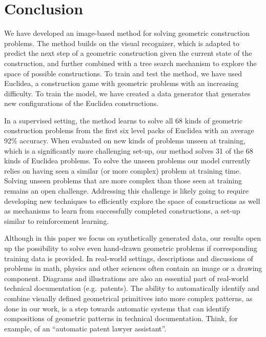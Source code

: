 

\section{Conclusion}

We have developed an image-based method for solving geometric construction problems. The method builds on the \maskrcnn visual recognizer, which is adapted to predict the next step of a geometric construction given the current state of the construction, and further combined with a tree search mechanism to explore the space of possible constructions. To train and test the method, we have used Euclidea, a construction game with geometric problems with an increasing difficulty. To train the model, we have created a data generator that generates new configurations of the Euclidea constructions. 

In a supervised setting, the method learns to solve all 68 kinds of geometric construction problems from the first six level packs of Euclidea with an average 92\% accuracy. When evaluated on new kinds of problems unseen at training, which is a significantly more challenging set-up, our method solves 31 of the 68 kinds of Euclidea problems. 
To solve the unseen problems our model currently relies on having seen a similar (or more complex) problem at training time. Solving unseen problems that are more complex than those seen at training remains an open challenge. Addressing this challenge is likely going to require developing new techniques to efficiently explore the space of constructions as well as mechanisms to learn from successfully completed constructions, a set-up similar to reinforcement learning. 

Although in this paper we focus on synthetically generated data, our results open up the possibility to solve even hand-drawn geometric problems if corresponding training data is provided. 
In real-world settings, descriptions and discussions of problems in math, physics and other sciences often contain an image or a drawing component. Diagrams and illustrations are also an essential part of real-world technical documentation (e.g.~patents). The ability to automatically identify and combine visually defined geometrical primitives into more complex patterns, as done in our work, is a step towards automatic systems that can identify compositions of geometric patterns in technical documentation. Think, for example, of an ``automatic patent lawyer assistant''.


